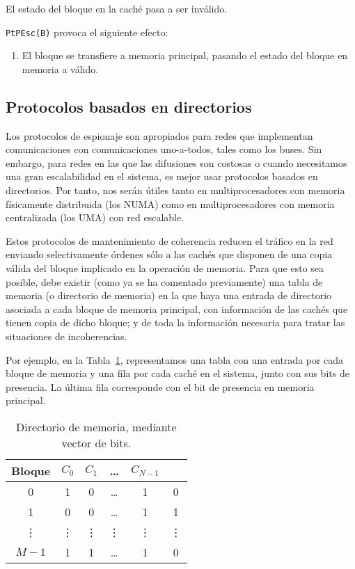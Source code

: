 \begin{description}
        El estado del bloque en la caché pasa a ser inválido.

        \verb|PtPEsc(B)| provoca el siguiente efecto:
        \begin{enumerate}
            \item El bloque se transfiere a memoria principal, pasando el estado del bloque en memoria a válido.
        \end{enumerate}
\end{description}

\subsection{Protocolos basados en directorios}
Los protocolos de espionaje son apropiados para redes que implementan comunicaciones con comunicaciones uno-a-todos, tales como los buses. Sin embargo, para redes en las que las difusiones son costosas o cuando necesitamos una gran escalabilidad en el sistema, es mejor usar protocolos basados en directorios. Por tanto, nos serán útiles tanto en multiprocesadores con memoria físicamente distribuida (los NUMA) como en multiprocesadores con memoria centralizada (los UMA) con red escalable.

Estos protocolos de mantenimiento de coherencia reducen el tráfico en la red enviando selectivamente órdenes sólo a las cachés que disponen de una copia válida del bloque implicado en la operación de memoria. Para que esto sea posible, debe existir (como ya se ha comentado previamente) una tabla de memoria (o directorio de memoria) en la que haya una entrada de directorio asociada a cada bloque de memoria principal, con información de las cachés que tienen copia de dicho bloque; y de toda la información necesaria para tratar las situaciones de incoherencias. 

Por ejemplo, en la Tabla~\ref{tab:directorio_memoria}, representamos una tabla con una entrada por cada bloque de memoria y una fila por cada caché en el sistema, junto con sus bits de presencia. La última fila corresponde con el bit de presencia en memoria principal.\\

\begin{table}[H]
\centering
\begin{tabular}{c c c c c c}
    Bloque & $C_0$ & $C_1$ & \ldots & $C_{N-1}$ & \\
    \bottomrule
    0 & 1 & 0 & \ldots & 1 & 0 \\
    1 & 0 & 0 & \ldots & 1 & 1 \\
    \vdots & \vdots & \vdots & \vdots & \vdots & \vdots \\
    $M-1$ & 1 & 1 & \ldots & 1 & 0 \\
\end{tabular}
\caption{Directorio de memoria, mediante vector de bits.}
\label{tab:directorio_memoria}
\end{table}

